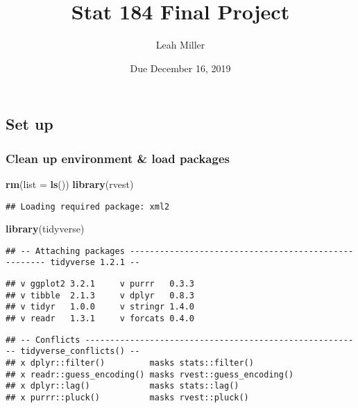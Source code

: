 \documentclass[]{article}
\title{Stat 184 Final Project}
\author{Leah Miller}
\date{Due December 16, 2019}
\newenvironment{Shaded}{\begin{snugshade}}{\end{snugshade}}
\newcommand{\DataTypeTok}[1]{\textcolor[rgb]{0.13,0.29,0.53}{#1}}
\newcommand{\KeywordTok}[1]{\textcolor[rgb]{0.13,0.29,0.53}{\textbf{#1}}}
\newcommand{\NormalTok}[1]{#1}
\begin{document}
\maketitle

\hypertarget{set-up}{%
\subsection{Set up}\label{set-up}}

\hypertarget{clean-up-environment-load-packages}{%
\subsubsection{Clean up environment \& load
packages}\label{clean-up-environment-load-packages}}

\begin{Shaded}
\begin{Highlighting}[]
\KeywordTok{rm}\NormalTok{(}\DataTypeTok{list =} \KeywordTok{ls}\NormalTok{())}
\KeywordTok{library}\NormalTok{(rvest)}
\end{Highlighting}
\end{Shaded}

\begin{verbatim}
## Loading required package: xml2
\end{verbatim}

\begin{Shaded}
\begin{Highlighting}[]
\KeywordTok{library}\NormalTok{(tidyverse)}
\end{Highlighting}
\end{Shaded}

\begin{verbatim}
## -- Attaching packages ----------------------------------------------------- tidyverse 1.2.1 --
\end{verbatim}

\begin{verbatim}
## v ggplot2 3.2.1     v purrr   0.3.3
## v tibble  2.1.3     v dplyr   0.8.3
## v tidyr   1.0.0     v stringr 1.4.0
## v readr   1.3.1     v forcats 0.4.0
\end{verbatim}

\begin{verbatim}
## -- Conflicts -------------------------------------------------------- tidyverse_conflicts() --
## x dplyr::filter()         masks stats::filter()
## x readr::guess_encoding() masks rvest::guess_encoding()
## x dplyr::lag()            masks stats::lag()
## x purrr::pluck()          masks rvest::pluck()
\end{verbatim}
\end{document}
